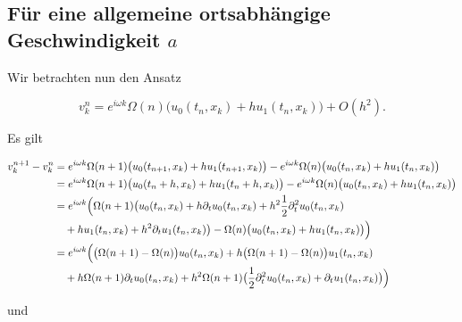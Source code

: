 \subsection*{Für eine allgemeine ortsabhängige Geschwindigkeit $a$}

Wir betrachten nun den Ansatz

\[ v^n_k = e^{i \omega k} \Omega(n) \bigl( u_0(t_n, x_k) + h u_1(t_n, x_k) \bigr) + O(h^2). \]

Es gilt

\begin{align}
\begin{split}
v^{n+1}_k - v^n_k &= e^{i \omega k} \Omega(n+1) \bigl( u_0(t_{n+1}, x_k) + h u_1(t_{n+1}, x_k) \bigr)
- e^{i \omega k} \Omega(n) \bigl( u_0(t_n, x_k) + h u_1(t_n, x_k) \bigr)\\
&= e^{i \omega k} \Omega(n+1) \bigl( u_0(t_n + h, x_k) + h u_1(t_n + h, x_k) \bigr)
- e^{i \omega k} \Omega(n) \bigl( u_0(t_n, x_k) + h u_1(t_n, x_k) \bigr)\\
&= e^{i \omega k} \Bigl( \Omega(n+1) \bigl( u_0(t_n, x_k) + h \partial_t u_0(t_n, x_k) + h^2 \frac{1}{2} \partial^2_t u_0(t_n, x_k)\\
&\quad + h u_1(t_n, x_k) + h^2 \partial_t u_1(t_n, x_k) \bigr) - \Omega(n) \bigl( u_0(t_n, x_k) + h u_1(t_n, x_k) \bigr) \Bigr)\\
&= e^{i \omega k} \Bigl( \bigl(\Omega(n+1) - \Omega(n) \bigr) u_0(t_n, x_k) + h \bigl(\Omega(n+1) - \Omega(n) \bigr) u_1(t_n, x_k)\\
&\quad + h \Omega(n+1) \partial_t u_0(t_n, x_k) + h^2 \Omega(n+1) \bigl( \frac{1}{2} \partial^2_t u_0(t_n, x_k) + \partial_t u_1(t_n, x_k) \bigr) \Bigr)
\end{split}
\end{align}

und

